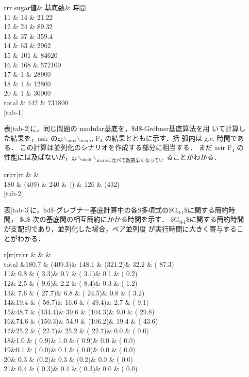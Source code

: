 \documentclass[a4j,12pt]{jarticle}
\begin{document}
{{rrr sugar値\& 基底数\& 時間\\
11 \& 14 \& 21.22\\
12 \& 24 \& 89.32\\
13 \& 37 \& 359.4\\
14 \& 63 \& 2962\\
15 \& 101 \& 84620\\
16 \& 168 \& 572100\\
17 \& 1 \& 28900\\
18 \& 1 \& 12800\\
20 \& 1 \& 30000\\
total \& 442 \& 731800\\

[tab-1]

表[tab-2]に，同じ問題の modular基底を，\$d\$-Gröbner基底算法を用
いて計算した結果を，asir のgr$\backslash$\(_{\text{mod}}\)$\backslash$\(_{\text{main}}\), F\(_4\) の結果とともに示す．括
弧内は g.c. 時間である．
この計算は並列化のシナリオを作成する部分に相当する． まだ asir F\(_4\)
の性能には及ばないが，gr$\backslash$\(_{\text{mode}}\)$\backslash$\(_{\text{mainに比べて数割早くなってい}}\)
ることがわかる．

rr|rr|rr \& \&\\
180 \& (409) \& 240 \& () \& 126 \& (432)\\

[tab-2]

表[tab-3]に，\$d\$-グレブナー基底計算中の各S多項式の\$G\(_{\text{d-1}}\)\$に関する簡約時間，
\$d\$-次の基底間の相互簡約にかかる時間を示す．
\$G\(_{\text{d-1}}\)\$に関する簡約時間が支配的であり，並列化した場合，ペア並列度
が実行時間に大きく寄与することがわかる．

r|rr|rr|rr \& \& \&\\
total \&180.7 \& (409.3)\& 148.1 \& (321.2)\& 32.2 \& ( 87.3)\\
11\& 0.8 \& ( 3.3)\& 0.7 \& ( 3.1)\& 0.1 \& ( 0.2)\\
12\& 2.5 \& ( 9.6)\& 2.2 \& ( 8.4)\& 0.3 \& ( 1.2)\\
13\& 7.6 \& ( 27.7)\& 6.8 \& ( 24.5)\& 0.8 \& ( 3.2)\\
14\&19.4 \& ( 58.7)\& 16.6 \& ( 49.4)\& 2.7 \& ( 9.1)\\
15\&48.7 \& (134.4)\& 39.6 \& (104.3)\& 9.0 \& ( 29.8)\\
16\&74.6 \& (150.3)\& 54.9 \& (106.2)\& 19.4 \& ( 43.6)\\
17\&25.2 \& ( 22.7)\& 25.2 \& ( 22.7)\& 0.0 \& ( 0.0)\\
18\&1.0 \& ( 0.9)\& 1.0 \& ( 0.9)\& 0.0 \& ( 0.0)\\
19\&0.1 \& ( 0.0)\& 0.1 \& ( 0.0)\& 0.0 \& ( 0.0)\\
20\& 0.3 \& (0.2)\& 0.3 \& (0.2)\& 0.0 \& ( 0.0)\\
21\& 0.4 \& ( 0.3)\& 0.4 \& ( 0.3)\& 0.0 \& ( 0.0)\\

}}
\end{document}
